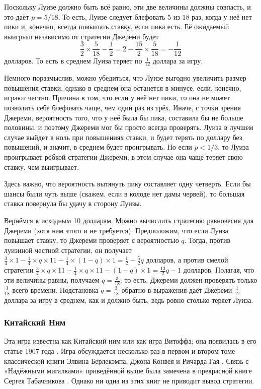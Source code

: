 Поскольку Луизе должно быть всё равно, эти две величины должны совпасть, и это даёт $p = 5/18$.
То есть, Луизе следует блефовать $5$ из $18$ раз, когда у неё нет пики и, конечно, всегда повышать ставку, если пика есть.
Её ожидаемый выигрыш независимо от стратегии Джереми будет
\[\frac32\times\frac5{18}-\frac12=2-\frac{15}2\times\frac5{18}=-\frac1{12}\]
долларов.
То есть в среднем Луиза теряет по $\tfrac1{12}$ доллара за игру.

Немного поразмыслив, можно убедиться, что Луизе выгодно увеличить размер повышения ставки,
однако в среднем она останется в минусе, если, конечно, играют честно.
Причина в том, что если у неё нет пики, то она не может позволить себе блефовать чаще, чем один раз из трёх.
Иначе, с точки зрения Джереми, вероятность того, что у неё была бы пика, составила бы не больше половины, и поэтому Джереми мог бы просто всегда проверять.
Луиза в лучшем случае выйдет в ноль при повышениях ставки, и будет терять по доллару без повышений, и значит, в среднем будет проигрывать.
Но если $p < 1/3$, то Луиза проигрывает робкой стратегии Джереми;
в этом случае она чаще теряет свою ставку, чем выигрывает.

Здесь важно, что вероятность вытянуть пику составляет одну четверть.
Если бы шансы были чуть выше (скажем, если в колоде нет дамы червей), то большая ставка повернула бы удачу в сторону Луизы.

Вернёмся к исходным 10 долларам.
Можно вычислить стратегию равновесия для Джереми (хотя нам этого и не требуется).
Предположим, что если Луиза повышает ставку, то Джереми проверяет с вероятностью $q$.
Тогда, против луизиной честной стратегии, он получает $\tfrac34 \times 1 - \tfrac14 \times q \times 11 - \tfrac14 \times (1 - q) \times 1 = \tfrac12 - \tfrac52q$ долларов,
а против смелой стратегии $\tfrac34 \times q \times 11 - \tfrac14 \times q \times 11 - (1 - q) \times 1 = \tfrac{13}2q - 1$ долларов.
Полагая, что эти величины равны, получаем $q = \tfrac3{18}$; то есть, Джереми должен проверять только $\tfrac3{18}$ всего времени.
Подстановка $q = \tfrac3{18}$ обратно в выражения даёт Джереми $\tfrac1{12}$ доллара за игру в среднем, как и должно быть, ведь ровно столько теряет Луиза.

\subsubsection*{Китайский Ним}

Эта игра известна как Китайский ним или как игра Витоффа;
она появилась в его статье 1907 года \cite{60}.
Игра обсуждается несколько раз в первом и втором томе классической книги Элвина Берлекэмпа, Джона Конвея и Ричарда  Гая \cite{4}.
Связь с «Надёжными мигалками» приведённой выше была замечена в прекрасной книге Сергея Табачникова \cite{56}.
Однако ни одна из этих книг не приводит вывод стратегии.

